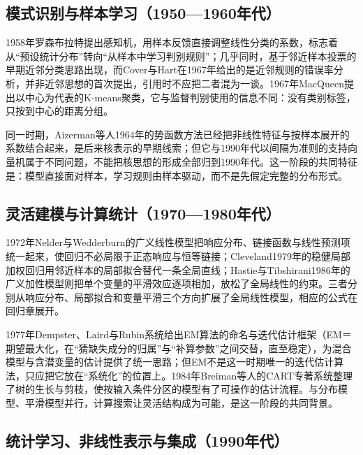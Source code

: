 \subsection{模式识别与样本学习（1950—1960年代）}
\label{sec:classic-history-pattern}

1958年罗森布拉特提出感知机，用样本反馈直接调整线性分类的系数，标志着从“预设统计分布”转向“从样本中学习判别规则”；几乎同时，基于邻近样本投票的早期近邻分类思路出现，而Cover与Hart在1967年给出的是近邻规则的错误率分析，并非近邻思想的首次提出，引用时不应把二者混为一谈。1967年MacQueen提出以中心为代表的K-means聚类，它与监督判别使用的信息不同：没有类别标签，只按到中心的距离分组。

同一时期，Aizerman等人1964年的势函数方法已经把非线性特征与按样本展开的系数结合起来，是后来核表示的早期线索；但它与1990年代以间隔为准则的支持向量机属于不同问题，不能把核思想的形成全部归到1990年代。这一阶段的共同特征是：模型直接面对样本，学习规则由样本驱动，而不是先假定完整的分布形式。

\subsection{灵活建模与计算统计（1970—1980年代）}
\label{sec:classic-history-flexible}

1972年Nelder与Wedderburn的广义线性模型把响应分布、链接函数与线性预测项统一起来，使回归不必局限于正态响应与恒等链接；Cleveland1979年的稳健局部加权回归用邻近样本的局部拟合替代一条全局直线；Hastie与Tibshirani1986年的广义加性模型则把单个变量的平滑效应逐项相加，放松了全局线性的约束。三者分别从响应分布、局部拟合和变量平滑三个方向扩展了全局线性模型，相应的公式在回归章展开。

1977年Dempster、Laird与Rubin系统给出EM算法的命名与迭代估计框架（EM＝期望最大化，在“猜缺失成分的归属”与“补算参数”之间交替，直至稳定），为混合模型与含潜变量的估计提供了统一思路；但EM不是这一时期唯一的迭代估计算法，只应把它放在“系统化”的位置上。1984年Breiman等人的CART专著系统整理了树的生长与剪枝，使按输入条件分区的模型有了可操作的估计流程。与分布模型、平滑模型并行，计算搜索让灵活结构成为可能，是这一阶段的共同背景。

\subsection{统计学习、非线性表示与集成（1990年代）}
\label{sec:classic-history-statistical}

